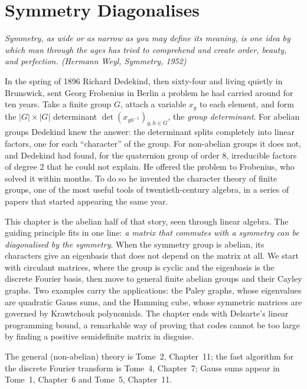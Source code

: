 \chapter{Symmetry Diagonalises}\label{ch:symmetry}

\begin{center}\itshape
Symmetry, as wide or as narrow as you may define its meaning, is one idea by which man through the ages has tried to comprehend
and create order, beauty, and perfection.
\upshape(Hermann Weyl, \emph{Symmetry}, 1952)
\end{center}

In the spring of 1896 Richard Dedekind, then sixty-four and living quietly in Brunswick, sent Georg Frobenius in Berlin a problem
he had carried around for ten years. Take a finite group $G$, attach a variable $x_g$ to each element, and form the $|G|\times|G|$
determinant $\det(x_{gh^{-1}})_{g,h\in G}$, the \emph{group determinant}. For abelian groups Dedekind knew the answer: the
determinant splits completely into linear factors, one for each ``character'' of the group. For non-abelian groups it does not,
and Dedekind had found, for the quaternion group of order $8$, irreducible factors of degree $2$ that he could not explain. He
offered the problem to Frobenius, who solved it within months. To do so he invented the character theory of finite groups, one
of the most useful tools of twentieth-century algebra, in a series of papers that started appearing the same year.

This chapter is the abelian half of that story, seen through linear algebra. The guiding principle fits in one line:
\emph{a matrix that commutes with a symmetry can be diagonalised by the symmetry}. When the symmetry group is abelian, its
characters give an eigenbasis that does not depend on the matrix at all. We start with circulant matrices, where the group is
cyclic and the eigenbasis is the discrete Fourier basis, then move to general finite abelian groups and their Cayley graphs.
Two examples carry the applications: the Paley graphs, whose eigenvalues are quadratic Gauss sums, and the Hamming cube, whose
symmetric matrices are governed by Krawtchouk polynomials. The chapter ends with Delsarte's linear programming bound, a
remarkable way of proving that codes cannot be too large by finding a positive semidefinite matrix in disguise.

The general (non-abelian) theory is Tome~2, Chapter~11; the fast algorithm for the discrete Fourier transform is Tome~4,
Chapter~7; Gauss sums appear in Tome~1, Chapter~6 and Tome~5, Chapter~11.

